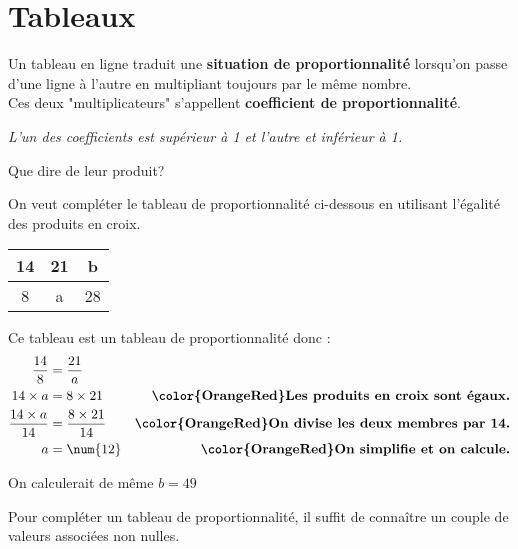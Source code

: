 \section{Tableaux}
\begin{definition}
    Un tableau en ligne traduit une \textbf{situation de proportionnalité} lorsqu'on passe d'une ligne à l'autre en multipliant toujours par le même nombre.\\
    Ces deux "multiplicateurs" s'appellent \textbf{coefficient de proportionnalité}.
\end{definition}

\begin{remarque}
    \textit{L'un des coefficients est supérieur à 1 et l'autre et inférieur à 1.}\par
    Que dire de leur produit?
\end{remarque}

\begin{exemple*1}
    On veut compléter le tableau de proportionnalité ci-dessous en utilisant l'égalité des produits en croix.
    \begin{center}
        \begin{tabular}{|c|c|c|}
            \hline
            14&21&b\\
            \hline
            8&a&28\\
            \hline
        \end{tabular}
    \end{center}

    \correction
    Ce tableau est un tableau de proportionnalité donc :
    \begin{align*}
        \dfrac{14}{8}           &=\dfrac{21}{a}             &\\
        14\times a              &=8\times 21                &\text{\bfseries \color{OrangeRed}Les produits en croix sont égaux.}\\
        \dfrac{14\times a}{14}  &= \dfrac{8\times 21}{14}   &\text{\bfseries \color{OrangeRed}On divise les deux membres par 14.}\\
        a                       &=\num{12}                  &\text{\bfseries \color{OrangeRed}On simplifie et on calcule.}
    \end{align*}

    On calculerait de même $b=49$
\end{exemple*1}

\begin{remarque}
    Pour compléter un tableau de proportionnalité, il suffit de connaître un couple de valeurs \og{} associées \fg{} non nulles.
\end{remarque}

